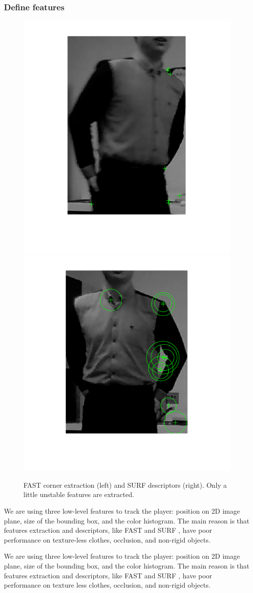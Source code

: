\documentclass[11pt,twocolumn,letterpaper]{article}
\begin{document}
\subsubsection*{Define features}
      \begin{figure}[h]
      \centering
      \includegraphics[width=0.45\linewidth]{./Pic/FAST.png}
	\includegraphics[width=0.45\linewidth]{./Pic/SURF.png}
      \caption{FAST corner extraction (left) and SURF descriptors (right). Only a little unstable features are extracted.}
      \end{figure}

We are using three low-level features to track the player: position on 2D image plane, size of the bounding box, and the color histogram. The main reason is that features extraction and descriptors, like FAST \cite{1544896} and SURF \cite{Bay2006}, have poor performance on texture-less clothes, occlusion, and non-rigid objects.

We are using three low-level features to track the player: position on 2D image plane, size of the bounding box, and the color histogram. The main reason is that features extraction and descriptors, like FAST \cite{1544896} and SURF \cite{Bay2006}, have poor performance on texture less clothes, occlusion, and non-rigid objects.
\end{document}
